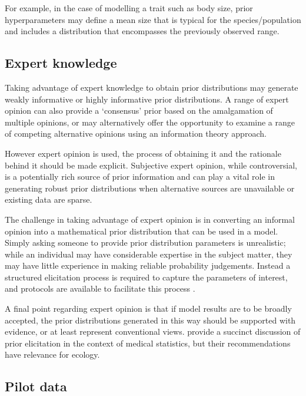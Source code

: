 \documentclass[
]{book}
\begin{document}
For example, in the case of modelling a trait such as body size, prior hyperparameters may define a mean size that is typical for the species/population and includes a distribution that encompasses the previously observed range.

\hypertarget{expert-knowledge}{%
\subsection{Expert knowledge}\label{expert-knowledge}}

Taking advantage of expert knowledge to obtain prior distributions may generate weakly informative or highly informative prior distributions. A range of expert opinion can also provide a `consensus' prior based on the amalgamation of multiple opinions, or may alternatively offer the opportunity to examine a range of competing alternative opinions using an information theory approach.

However expert opinion is used, the process of obtaining it and the rationale behind it should be made explicit. Subjective expert opinion, while controversial, is a potentially rich source of prior information and can play a vital role in generating robust prior distributions when alternative sources are unavailable or existing data are sparse.

The challenge in taking advantage of expert opinion is in converting an informal opinion into a mathematical prior distribution that can be used in a model. Simply asking someone to provide prior distribution parameters is unrealistic; while an individual may have considerable expertise in the subject matter, they may have little experience in making reliable probability judgements. Instead a structured elicitation process is required to capture the parameters of interest, and protocols are available to facilitate this process \citep{Spiegelhalter_2003}.

A final point regarding expert opinion is that if model results are to be broadly accepted, the prior distributions generated in this way should be supported with evidence, or at least represent conventional views. \citet{Spiegelhalter_2003} provide a succinct discussion of prior elicitation in the context of medical statistics, but their recommendations have relevance for ecology.

\hypertarget{pilot-data}{%
\subsection{Pilot data}\label{pilot-data}}
\end{document}
